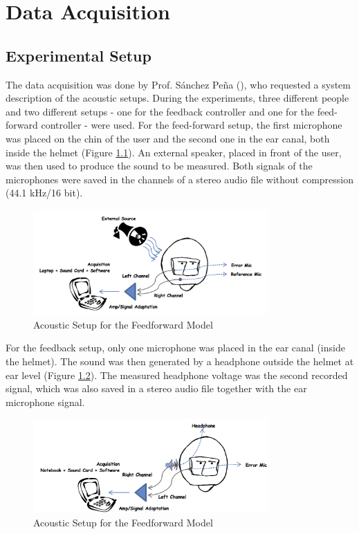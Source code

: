 \chapter{Data Acquisition}\label{chap: dataaq}
\section{Experimental Setup}
The data acquisition was done by Prof. S\'{a}nchez Pe\~{n}a (\cite{castae2010active}), who requested a system description of the acoustic setups. During the experiments, three different people and two different setups - one for the feedback controller and one for the feed-forward controller - were used. For the feed-forward setup, the first microphone was placed on the chin of the user and the second one in the ear canal, both inside the helmet (Figure \ref{fig:setupff}). An external speaker, placed in front of the user, was then used to produce the sound to be measured. Both signals of the microphones were saved in the channels of a stereo audio file without compression (44.1 kHz/16 bit).\\

\begin{figure}[h]
\centering
\includegraphics[width=0.8\textwidth]{pics/setupff}
\caption{Acoustic Setup for the Feedforward Model}
\label{fig:setupff}
\end{figure}

For the feedback setup, only one microphone was placed in the ear canal (inside the helmet). The sound was then generated by a headphone outside the helmet at ear level (Figure \ref{fig:setupfb}). The measured headphone voltage was the second recorded signal, which was also saved in a stereo audio file together with the ear microphone signal.

\begin{figure}[h]
\centering
\includegraphics[width=0.8\textwidth]{pics/setupfb}
\caption{Acoustic Setup for the Feedforward Model}
\label{fig:setupfb}
\end{figure}

